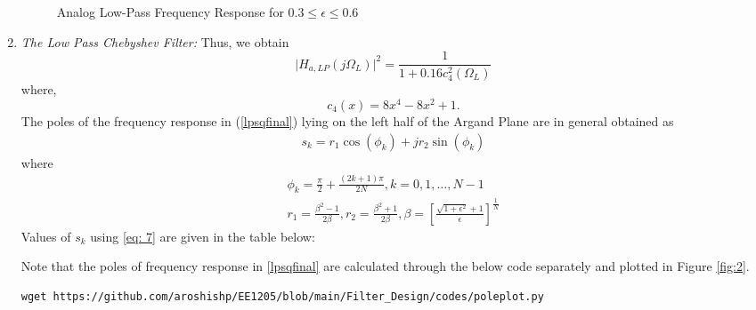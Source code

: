 \documentclass{article}
\begin{document}
\begin{enumerate}
\begin{figure}[!h]
    \caption{Analog Low-Pass Frequency Response for $0.3 \leq \epsilon \leq 0.6$}
    \label{fig:low_pass}
\end{figure}
\newpage
\item {\em The Low Pass Chebyshev Filter:} Thus, we obtain
\begin{equation}
\label{lpsqfinal}
\vert H_{a,LP}(j\Omega_L)\vert^2 = \frac{1}{1 + 0.16c_4^2(\Omega_L)}
\end{equation}
where,
\begin{equation}
c_4(x) = 8x^4 - 8x^2 + 1.	
\end{equation}
The poles of the frequency response in (\ref{lpsqfinal}) lying on the left half of the Argand Plane are in general obtained as
\begin{align}
    s_k = r_1\cos(\phi_k)+ jr_2\sin( \phi_k) \label{eq: 7}
\end{align}
where
\begin{eqnarray}
\label{lppoles}
\phi_k = \frac{\pi}{2} + \frac{(2k+1)\pi}{2N}, k = 0, 1, \dots, N-1 \nonumber \\
r_1 = \frac{\beta^2 - 1}{2\beta}, r_2 = \frac{\beta^2 + 1}{2\beta}, \beta = \left[ \frac{\sqrt{1 + \epsilon^2} + 1}{\epsilon}\right]^{\frac{1}{N}}
\end{eqnarray}
Values of $s_k$ using \eqref{eq: 7} are given in the table below:


Note that the poles of frequency response in \eqref{lpsqfinal} are calculated through the below code separately and plotted in Figure \ref{fig:2}.\\

\begin{lstlisting}[caption = {Code for Figure 2}]
wget https://github.com/aroshishp/EE1205/blob/main/Filter_Design/codes/poleplot.py
\end{lstlisting}


\end{enumerate}
\end{document}
